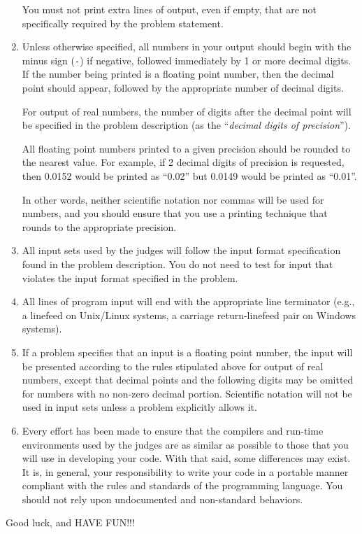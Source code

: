 \begin{enumerate}
\begin{itemize}
    \end{itemize}

    You must not print extra lines of output, even if empty, that are
    not specifically required by the problem statement.

\item Unless otherwise specified, all numbers in your output
  should begin with the minus sign ({\tt -}) if negative, followed
  immediately by 1 or more decimal digits.  If the number being
  printed is a floating point number, then the decimal point should
  appear, followed by the appropriate number of decimal digits. 

  For output of real numbers, the number of digits after the decimal
  point will be specified in the problem description (as the
  ``{\em decimal digits of precision}'').

  All floating point numbers printed to a given precision should be
  rounded to the nearest value.  For example, if 2 decimal digits of
  precision is requested, then 0.0152 would be printed as ``0.02'' but
  0.0149 would be printed as ``0.01''.

  In other words, neither scientific notation nor commas will be
  used for numbers, and you should ensure that you use a printing
  technique that rounds to the appropriate precision.

  

\item All input sets used by the judges will follow the input format
  specification found in the problem description. You do not need to
  test for input that violates the input format specified in the problem.
  
\item All lines of program input will end with the
 appropriate line terminator (e.g., a linefeed on Unix/Linux systems,
 a carriage return-linefeed pair on Windows systems).


\item If a problem specifies that
      an input is a floating point number, the input will be presented
      according to the rules stipulated above for output of real
      numbers, except that decimal points and the following digits may
      be omitted for numbers with no non-zero decimal
      portion. Scientific notation will not be used in input sets
      unless a problem explicitly allows it.




\item Every effort has been made to ensure that the compilers
 and run-time environments used by the judges are as similar as
 possible to those that you will use in developing your code.  
 With that said, some differences may exist. It is, in general, 
 your responsibility to write your code in a portable manner
 compliant with the rules and standards of the programming language. 
 You should not rely upon undocumented and non-standard behaviors.

\end{enumerate}


Good luck, and HAVE FUN!!!
